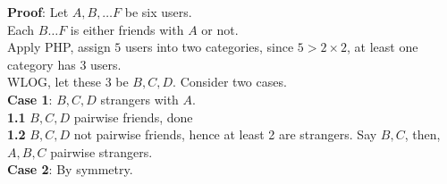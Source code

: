 \textbf{Proof}: Let $A, B, \hdots F$ be six users. \\

Each  $B \hdots F$ is either friends with $A$ or not. \\

Apply PHP, assign $5$ users into two categories, since $5 > 2 \times 2$, at least one category has 3 users. \\

WLOG, let these 3 be $B, C, D$. Consider two cases. \\

\textbf{Case 1}: $B, C, D$ strangers with $A$.\\

\textbf{1.1} $B, C, D$ pairwise friends, done \\
\textbf{1.2} $B, C, D$ not pairwise friends, hence at least 2 are strangers. Say $B, C$, then, $A, B, C$ pairwise strangers. \\

\textbf{Case 2}: By symmetry.





